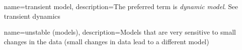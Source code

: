 {
	name=transient model,
	description=The preferred term is \textit{dynamic model}.  See transient dynamics
}


{
    name=unstable (models),
    description=Models that are very sensitive to small changes in the data (small changes in data lead to a different model)
}


